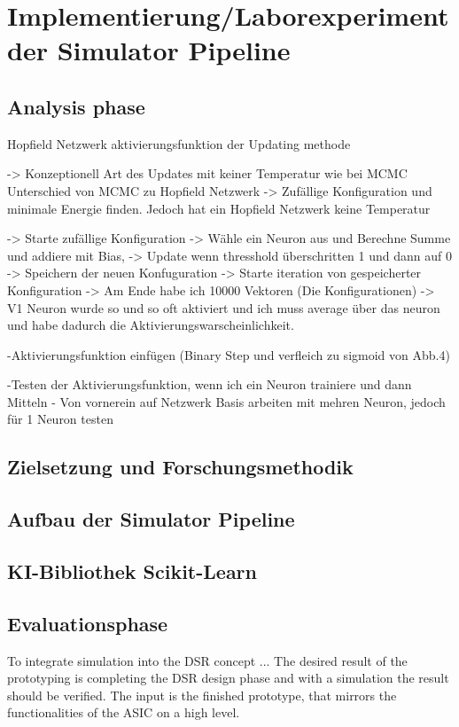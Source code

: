 \chapter{Implementierung/Laborexperiment der Simulator Pipeline}

\section{Analysis phase}

Hopfield Netzwerk aktivierungsfunktion der Updating methode

-> Konzeptionell Art des Updates mit keiner Temperatur wie bei MCMC 
Unterschied von MCMC zu Hopfield Netzwerk -> Zufällige Konfiguration und minimale Energie finden. Jedoch hat ein Hopfield
Netzwerk keine Temperatur 

-> Starte zufällige Konfiguration
-> Wähle ein Neuron aus und Berechne Summe und addiere mit Bias, 
-> Update wenn thresshold überschritten 1 und dann auf 0 
-> Speichern der neuen Konfuguration 
-> Starte iteration von gespeicherter Konfiguration 
-> Am Ende habe ich 10000 Vektoren (Die Konfigurationen) -> V1 Neuron wurde so und so oft aktiviert und ich muss average
über das neuron und habe dadurch die Aktivierungswarscheinlichkeit.

-Aktivierungsfunktion einfügen (Binary Step und verfleich zu sigmoid von Abb.4)


-Testen der Aktivierungsfunktion, wenn ich ein Neuron trainiere und dann Mitteln 
- Von vornerein auf Netzwerk Basis arbeiten mit mehren Neuron, jedoch für 1 Neuron testen




\section{Zielsetzung und Forschungsmethodik}
\section{Aufbau der Simulator Pipeline}
\section{KI-Bibliothek Scikit-Learn}
\section{Evaluationsphase}

To integrate simulation into the DSR concept ... 
The desired result of the prototyping is completing the \ac{DSR} design phase and with a simulation the result should be verified.
The input is the finished prototype, that mirrors the functionalities of the \ac{ASIC} on a high level.
